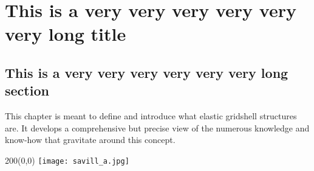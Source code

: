
\newrefsegment
\chapter{This is a very very very very very very long title}

\section{This is a very very very very very very long section}

This chapter is meant to define and introduce what elastic gridshell structures are. It develops a comprehensive but precise view of the numerous knowledge and know-how that gravitate around this concept.

\kant[1-26]


\cleartoleftpage
{}
\clearpage
{}


\clearpage
\kant[1-2]

\begin{textblock}{200}(0,0)%
	\texttt{[image: savill\_a.jpg]}
\end{textblock}




